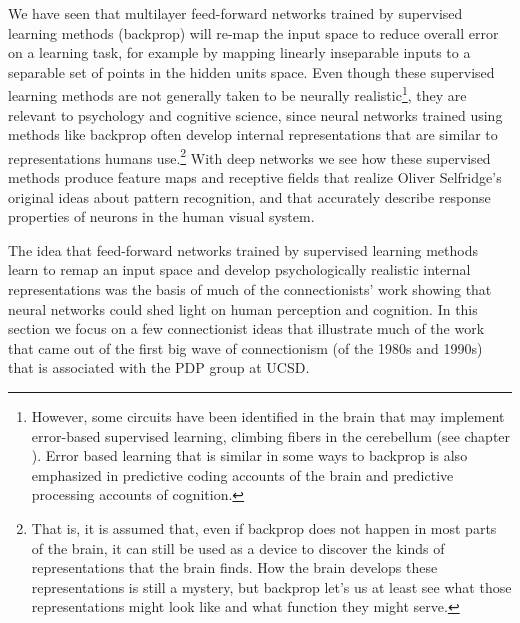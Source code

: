 We have seen that multilayer feed-forward networks trained by supervised learning methods (\eg backprop) will re-map the input space to reduce overall error on a learning task, for example by mapping linearly inseparable inputs to a separable set of points in the hidden units space. Even though these supervised learning methods are not generally taken to be neurally realistic\footnote{However, some circuits have been identified in the brain that may implement error-based supervised learning, \eg climbing fibers in the cerebellum (see chapter ). Error based learning that is similar in some ways to backprop is also emphasized in predictive coding accounts of the brain and predictive processing accounts of cognition.}, they are relevant to psychology and cognitive science, since neural networks trained using methods like backprop often develop internal representations that are similar to representations humans use.\footnote{That is, it is assumed that, even if backprop does not happen in most parts of the brain, it can still be used as a device to discover the kinds of representations that the brain finds. How the brain develops these representations is still a mystery, but backprop let's us at least see what those representations might look like and what function they might serve.} With deep networks we see how these supervised methods produce feature maps and receptive fields that realize Oliver Selfridge's original ideas about pattern recognition, and that accurately describe response properties of neurons in the human visual system. 

The idea that feed-forward networks trained by supervised learning methods learn to remap an input space and develop  psychologically realistic internal representations was the basis of much of the connectionists' work showing that neural networks could shed light on human perception and cognition. In this section we focus on a few connectionist ideas that illustrate much of the work that came out of the first big wave of connectionism (of the 1980s and 1990s) that is associated with the PDP group at UCSD. 

